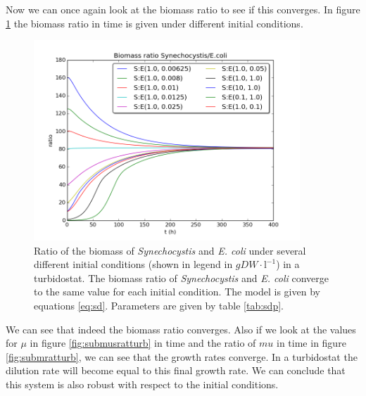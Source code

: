 \documentclass[10pt]{report}
\begin{document}

Now we can once again look at the biomass ratio to see if this converges. In figure \ref{fig:subratturb} the biomass ratio in time is given under different initial conditions.

\begin{figure}[!ht]
 \begin{center}  
     \includegraphics[width=10cm]{sub_dependent_turbidostat_bratio.png}
     \caption{Ratio of the biomass of \textit{Synechocystis} and \textit{E. coli} under several different initial conditions (shown in legend in $gDW\cdot \text{l}^{-1}$) in a turbidostat. The biomass ratio of \textit{Synechocystis} and \textit{E. coli} converge to the same value for each initial condition. The model is given by equations \ref{eq:sd}. Parameters are given by table \ref{tab:sdp}.}
    \label{fig:subratturb}
    \end{center}
\end{figure}

We can see that indeed the biomass ratio converges. Also if we look at the values for $\mu$ in figure \ref{fig:submusratturb} in time and the ratio of $mu$ in time in figure \ref{fig:submratturb}, we can see that the growth rates converge. In a turbidostat the dilution rate will become equal to this final growth rate. We can conclude that this system is also robust with respect to the initial conditions.
\end{document}

